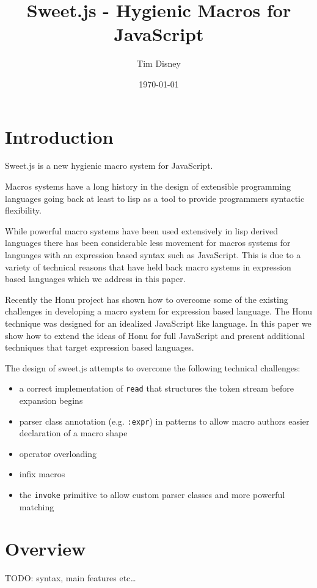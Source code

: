 \documentclass[preprint,10pt]{sigplanconf}
\author{Tim Disney}
\date{\today}
\title{Sweet.js - Hygienic Macros for JavaScript}
\begin{document}
\maketitle

\section{Introduction}
\label{sec-1}

Sweet.js is a new hygienic macro system for JavaScript.

Macros systems have a long history in the design of extensible
programming languages going back at least to lisp as a tool to provide
programmers syntactic flexibility.

While powerful macro systems have been used extensively in lisp
derived languages there has been considerable less movement for macros
systems for languages with an expression based syntax such as
JavaScript. This is due to a variety of technical reasons that have
held back macro systems in expression based languages which we address
in this paper.

Recently the Honu project has shown how to overcome some of the
existing challenges in developing a macro system for expression based
language. The Honu technique was designed for an idealized JavaScript
like language. In this paper we show how to extend the ideas of Honu
for full JavaScript and present additional techniques that target
expression based languages.

The design of sweet.js attempts to overcome the following technical
challenges: 

\begin{itemize}
\item a correct implementation of \texttt{read} that structures the
  token stream before expansion begins
\item parser class annotation (e.g. \texttt{:expr}) in patterns to
  allow macro authors easier declaration of a macro shape
\item operator overloading
\item infix macros
\item the \texttt{invoke} primitive to allow custom parser classes and
  more powerful matching
\end{itemize}

\section{Overview}
\label{sec-2}
TODO: syntax, main features etc\ldots
\end{document}
